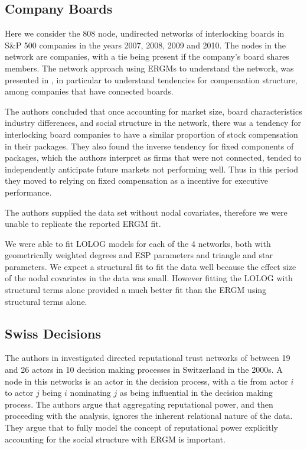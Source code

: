 \documentclass[
]{statsoc}
\begin{document}
\subsection{Company Boards}

Here we consider the 808 node, undirected networks of interlocking
boards in S\&P 500 companies in the years 2007, 2008, 2009 and 2010. The
nodes in the network are companies, with a tie being present if the
company's board shares members. The network approach using ERGMs to
understand the network, was presented in \cite{Gygax2015}, in particular
to understand tendencies for compensation structure, among companies
that have connected boards.

The authors concluded that once accounting for market size, board
characteristics industry differences, and social structure in the
network, there was a tendency for interlocking board companies to have a
similar proportion of stock compensation in their packages. They also
found the inverse tendency for fixed components of packages, which the
authors interpret as firms that were not connected, tended to
independently anticipate future markets not performing well. Thus in
this period they moved to relying on fixed compensation as a incentive
for executive performance.

The authors supplied the data set without nodal covariates, therefore we
were unable to replicate the reported ERGM fit.

We were able to fit LOLOG models for each of the 4 networks, both with
geometrically weighted degrees and ESP parameters and triangle and star
parameters. We expect a structural fit to fit the data well because the
effect size of the nodal covariates in the data was small. However
fitting the LOLOG with structural terms alone provided a much better fit
than the ERGM using structural terms alone.

\subsection{Swiss Decisions}

The authors in \cite{Fischer2015} investigated directed reputational
trust networks of between 19 and 26 actors in 10 decision making
processes in Switzerland in the 2000s. A node in this networks is an
actor in the decision process, with a tie from actor \(i\) to actor
\(j\) being \(i\) nominating \(j\) as being influential in the decision
making process. The authors argue that aggregating reputational power,
and then proceeding with the analysis, ignores the inherent relational
nature of the data. They argue that to fully model the concept of
reputational power explicitly accounting for the social structure with
ERGM is important.
\end{document}
